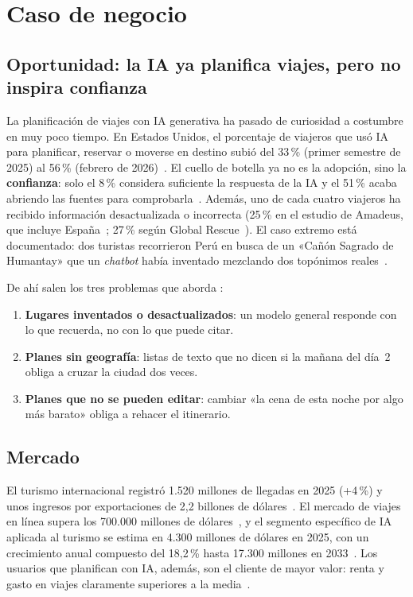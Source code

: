 \section{Caso de negocio}\label{sec:negocio}

\subsection{Oportunidad: la IA ya planifica viajes, pero no inspira confianza}

La planificación de viajes con IA generativa ha pasado de curiosidad a costumbre en muy poco
tiempo. En Estados Unidos, el porcentaje de viajeros que usó IA para planificar, reservar o
moverse en destino subió del 33\,\% (primer semestre de 2025) al 56\,\% (febrero de
2026)~\cite{phocuswright2026aisurge}. El cuello de botella ya no es la adopción, sino la
\textbf{confianza}: solo el 8\,\% considera suficiente la respuesta de la IA y el 51\,\% acaba
abriendo las fuentes para comprobarla~\cite{phocuswright2026aisurge}. Además, uno de cada cuatro
viajeros ha recibido información desactualizada o incorrecta (25\,\% en el estudio de Amadeus, que
incluye España~\cite{amadeus2025connected}; 27\,\% según Global Rescue~\cite{globalrescue2026}). El caso extremo está
documentado: dos turistas recorrieron Perú en busca de un «Cañón Sagrado de Humantay» que un
\emph{chatbot} había inventado mezclando dos topónimos reales~\cite{aiid2025humantay}.

De ahí salen los tres problemas que aborda \kyrian{}:
\begin{enumerate}[label=\textbf{P\arabic*}]
  \item \textbf{Lugares inventados o desactualizados}: un modelo general responde con lo que
        recuerda, no con lo que puede citar.
  \item \textbf{Planes sin geografía}: listas de texto que no dicen si la mañana del día~2
        obliga a cruzar la ciudad dos veces.
  \item \textbf{Planes que no se pueden editar}: cambiar «la cena de esta noche por algo más
        barato» obliga a rehacer el itinerario.
\end{enumerate}

\subsection{Mercado}

El turismo internacional registró 1.520 millones de llegadas en 2025 (+4\,\%) y unos ingresos por
exportaciones de 2,2 billones de dólares~\cite{untourism2026barometer}. El mercado de viajes en
línea supera los 700.000 millones de dólares~\cite{statista2026onlinetravel}, y el segmento
específico de IA aplicada al turismo se estima en 4.300 millones de dólares en 2025, con un crecimiento anual
compuesto del 18,2\,\% hasta 17.300 millones en 2033~\cite{grandview2025aitourism}. Los usuarios
que planifican con IA, además, son el cliente de mayor valor: renta y gasto en viajes claramente
superiores a la media~\cite{phocuswright2026aisurge}.

